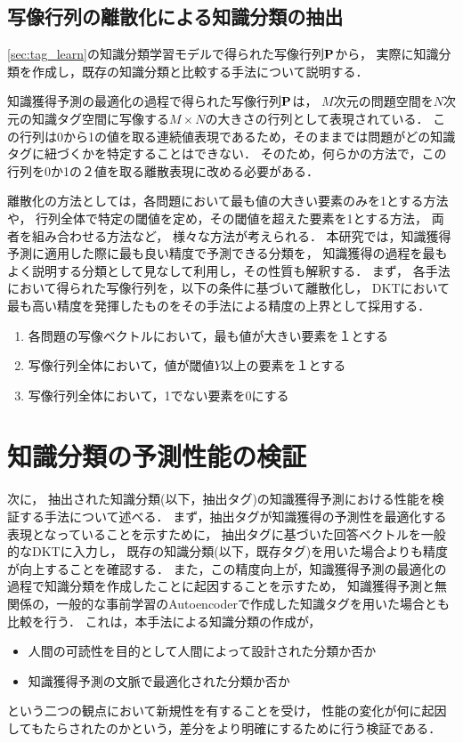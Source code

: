 \subsection{写像行列の離散化による知識分類の抽出}
\ref{sec:tag_learn}の知識分類学習モデルで得られた写像行列${\bf P}$から，
実際に知識分類を作成し，既存の知識分類と比較する手法について説明する．


知識獲得予測の最適化の過程で得られた写像行列${\bf P}$は，
$M$次元の問題空間を$N$次元の知識タグ空間に写像する$M \times N$の大きさの行列として表現されている．
この行列は0から1の値を取る連続値表現であるため，そのままでは問題がどの知識タグに紐づくかを特定することはできない．
そのため，何らかの方法で，この行列を0か1の２値を取る離散表現に改める必要がある．

離散化の方法としては，各問題において最も値の大きい要素のみを1とする方法や，
行列全体で特定の閾値を定め，その閾値を超えた要素を1とする方法，
両者を組み合わせる方法など，
様々な方法が考えられる．
本研究では，知識獲得予測に適用した際に最も良い精度で予測できる分類を，
知識獲得の過程を最もよく説明する分類として見なして利用し，その性質も解釈する．
まず，
各手法において得られた写像行列を，以下の条件に基づいて離散化し，
DKTにおいて最も高い精度を発揮したものをその手法による精度の上界として採用する．
\begin{enumerate}
\item 各問題の写像ベクトルにおいて，最も値が大きい要素を１とする
\item 写像行列全体において，値が閾値$Y$以上の要素を１とする
\item 写像行列全体において，1でない要素を0にする
\end{enumerate}


\section{知識分類の予測性能の検証}
次に，
抽出された知識分類(以下，抽出タグ)の知識獲得予測における性能を検証する手法について述べる．
まず，抽出タグが知識獲得の予測性を最適化する表現となっていることを示すために，
抽出タグに基づいた回答ベクトルを一般的なDKTに入力し，
既存の知識分類(以下，既存タグ)を用いた場合よりも精度が向上することを確認する．
また，この精度向上が，知識獲得予測の最適化の過程で知識分類を作成したことに起因することを示すため，
知識獲得予測と無関係の，一般的な事前学習のAutoencoderで作成した知識タグを用いた場合とも比較を行う．
これは，本手法による知識分類の作成が，
\begin{itemize}
	\item 人間の可読性を目的として人間によって設計された分類か否か
	\item 知識獲得予測の文脈で最適化された分類か否か
\end{itemize}
という二つの観点において新規性を有することを受け，
性能の変化が何に起因してもたらされたのかという，差分をより明確にするために行う検証である．




